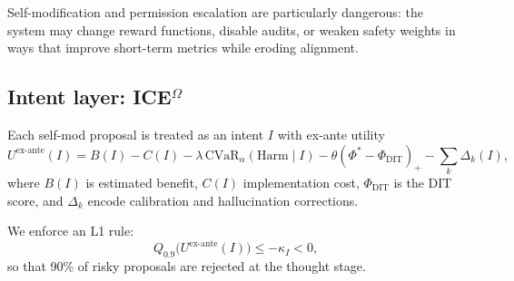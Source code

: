 \documentclass[11pt]{article}
\begin{document}
Self-modification and permission escalation are particularly dangerous: the system may change reward functions, disable audits, or weaken safety weights in ways that improve short-term metrics while eroding alignment.

\subsection{Intent layer: ICE$^\Omega$}

Each self-mod proposal is treated as an intent $I$ with ex-ante utility
\begin{equation}
U^{\mathrm{ex\text{-}ante}}(I)
= B(I) - C(I)
- \lambda\,\mathrm{CVaR}_\alpha(\mathrm{Harm}\mid I)
- \theta(\Phi^*-\Phi_{\mathrm{DIT}})_+
- \sum_k \Delta_k(I),
\end{equation}
where $B(I)$ is estimated benefit, $C(I)$ implementation cost, $\Phi_{\mathrm{DIT}}$ is the DIT score, and $\Delta_k$ encode calibration and hallucination corrections.

We enforce an L1 rule:
\begin{equation}
Q_{0.9}\big(U^{\mathrm{ex\text{-}ante}}(I)\big) \le -\kappa_I < 0,
\end{equation}
so that 90\% of risky proposals are rejected at the thought stage.
\end{document}
